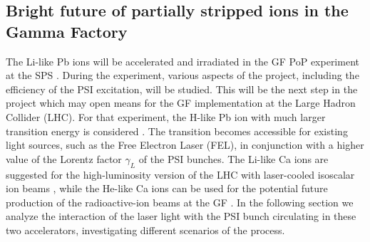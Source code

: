 \subsection{Bright future of partially stripped ions in the Gamma Factory}
\label{section.futurePSI}

The Li-like Pb ions will be accelerated and irradiated in the GF PoP experiment at the SPS \cite{GF-PoP-LoI:2019}.  During the experiment, various aspects of the project, including the efficiency of the PSI excitation, will be studied.  This will be the next step in the project which may open means for the GF implementation at the Large Hadron Collider (LHC).  For that experiment, the H-like Pb ion with much larger transition energy is considered \cite{Bessonov:1995eq}.  The transition becomes accessible for existing light sources, such as the Free Electron Laser (FEL), in conjunction with a higher value of the Lorentz factor $\gamma_L$ of the PSI bunches.
The Li-like Ca ions are suggested for the high-luminosity version of the LHC with laser-cooled isoscalar ion beams \cite{Krasny:2020wgx}, while the He-like Ca ions can be used for the potential future production of the radioactive-ion beams at the GF \cite{Nichita:2021iwa}.  In the following section we analyze the interaction of the laser light with the PSI bunch circulating in these two accelerators, investigating different scenarios of the process.